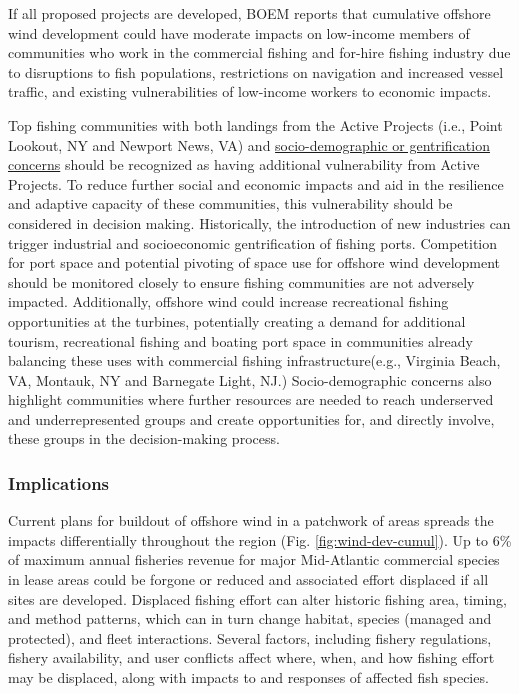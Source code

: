 \documentclass[
  10pt,
]{article}
\begin{document}
If all proposed projects are developed, BOEM reports that cumulative
offshore wind development could have moderate impacts on low-income
members of communities who work in the commercial fishing and for-hire
fishing industry due to disruptions to fish populations, restrictions on
navigation and increased vessel traffic, and existing vulnerabilities of
low-income workers to economic impacts.

Top fishing communities with both landings from the Active Projects
(i.e., Point Lookout, NY and Newport News, VA) and
\href{https://noaa-edab.github.io/catalog/engagement.html}{socio-demographic
or gentrification concerns} should be recognized as having additional
vulnerability from Active Projects. To reduce further social and
economic impacts and aid in the resilience and adaptive capacity of
these communities, this vulnerability should be considered in decision
making. Historically, the introduction of new industries can trigger
industrial and socioeconomic gentrification of fishing ports.
Competition for port space and potential pivoting of space use for
offshore wind development should be monitored closely to ensure fishing
communities are not adversely impacted. Additionally, offshore wind
could increase recreational fishing opportunities at the turbines,
potentially creating a demand for additional tourism, recreational
fishing and boating port space in communities already balancing these
uses with commercial fishing infrastructure(e.g., Virginia Beach, VA,
Montauk, NY and Barnegate Light, NJ.) Socio-demographic concerns also
highlight communities where further resources are needed to reach
underserved and underrepresented groups and create opportunities for,
and directly involve, these groups in the decision-making process.

\subsubsection{Implications}\label{implications-6}

Current plans for buildout of offshore wind in a patchwork of areas
spreads the impacts differentially throughout the region (Fig.
\ref{fig:wind-dev-cumul}). Up to 6\% of maximum annual fisheries revenue
for major Mid-Atlantic commercial species in lease areas could be
forgone or reduced and associated effort displaced if all sites are
developed. Displaced fishing effort can alter historic fishing area,
timing, and method patterns, which can in turn change habitat, species
(managed and protected), and fleet interactions. Several factors,
including fishery regulations, fishery availability, and user conflicts
affect where, when, and how fishing effort may be displaced, along with
impacts to and responses of affected fish species.
\end{document}
